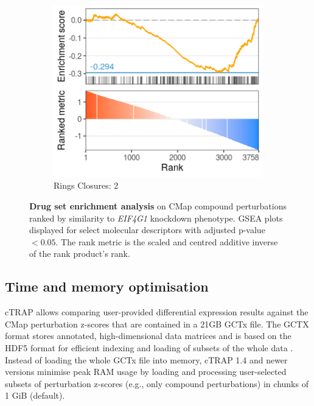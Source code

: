 \begin{figure}[!ht]
	\begin{subfigure}[h]{0.32\textwidth}
		\includegraphics[width=\textwidth]{images/ctrap/molecular-descriptors-c}
		\caption{\footnotesize{Rings Closures: 2}}
	\end{subfigure}
	\caption[Drug set enrichment analysis]{\textbf{Drug set enrichment analysis} on CMap compound perturbations ranked by similarity to \emph{EIF4G1} knockdown phenotype. GSEA plots displayed for select molecular descriptors with adjusted p-value $< 0.05$. The rank metric is the scaled and centred additive inverse of the rank product's rank.}
	\label{fig:ctrap-descriptors}
\end{figure}

\subsection{Time and memory optimisation}
\label{subsec:ctrap-optim}

cTRAP allows comparing user-provided differential expression results against the CMap perturbation z-scores that are contained in a 21GB GCTx file. The GCTX format stores annotated, high-dimensional data matrices and is based on the HDF5 format for efficient indexing and loading of subsets of the whole data \cite{enache:2018wq}. Instead of loading the whole GCTx file into memory, cTRAP 1.4 and newer versions minimise peak RAM usage by loading and processing user-selected subsets of perturbation z-scores (e.g., only compound perturbations) in chunks of 1 GiB (default).

